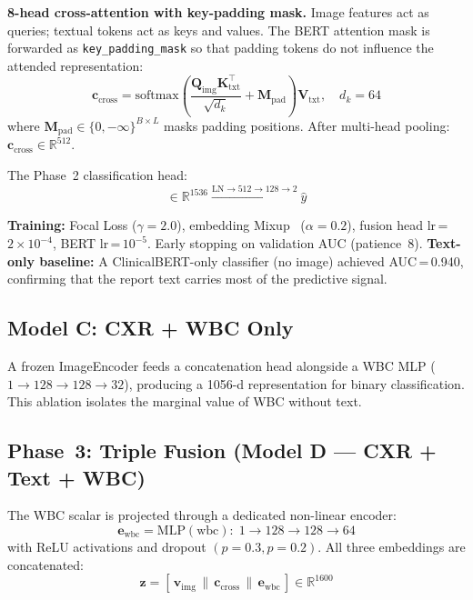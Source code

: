 \documentclass[conference]{IEEEtran}
\begin{document}
\textbf{8-head cross-attention with key-padding mask.} Image features act as queries; textual tokens act as keys and values. The BERT attention mask is forwarded as \texttt{key\_padding\_mask} so that padding tokens do not influence the attended representation:
\begin{equation}
  \mathbf{c}_{\text{cross}} = \text{softmax}\!\left(\frac{\mathbf{Q}_{\text{img}}\mathbf{K}_{\text{txt}}^\top}{\sqrt{d_k}} + \mathbf{M}_{\text{pad}}\right)\mathbf{V}_{\text{txt}}, \quad d_k = 64
  \label{eq:crossattn}
\end{equation}
where $\mathbf{M}_{\text{pad}} \in \{0, -\infty\}^{B\times L}$ masks padding positions. After multi-head pooling: $\mathbf{c}_{\text{cross}} \in \mathbb{R}^{512}$.

The Phase~2 classification head:
\begin{equation}
  [\mathbf{v}_{\text{img}} \,\|\ \mathbf{c}_{\text{cross}}] \in \mathbb{R}^{1536} \xrightarrow{\text{LN} \to 512 \to 128 \to 2} \hat{y}
\end{equation}

\textbf{Training:} Focal Loss ($\gamma\!=\!2.0$), embedding Mixup~\cite{zhang2018mixup} ($\alpha\!=\!0.2$), fusion head lr\,=\,$2\times10^{-4}$, BERT lr\,=\,$10^{-5}$. Early stopping on validation AUC (patience~8). \textbf{Text-only baseline:} A ClinicalBERT-only classifier (no image) achieved AUC\,=\,0.940, confirming that the report text carries most of the predictive signal.

\subsection{Model C: CXR + WBC Only}

A frozen ImageEncoder feeds a concatenation head alongside a WBC MLP ($1\to128\to128\to32$), producing a 1056-d representation for binary classification. This ablation isolates the marginal value of WBC without text.

\subsection{Phase~3: Triple Fusion (Model D — CXR + Text + WBC)}

The WBC scalar is projected through a dedicated non-linear encoder:
\begin{equation}
  \mathbf{e}_{\text{wbc}} = \text{MLP}(\text{wbc}): \; 1 \to 128 \to 128 \to 64
  \label{eq:wbcmlp}
\end{equation}
with ReLU activations and dropout $(p\!=\!0.3, p\!=\!0.2)$. All three embeddings are concatenated:
\begin{equation}
  \mathbf{z} = [\,\mathbf{v}_{\text{img}} \,\|\, \mathbf{c}_{\text{cross}} \,\|\, \mathbf{e}_{\text{wbc}}\,] \in \mathbb{R}^{1600}
  \label{eq:concat}
\end{equation}
\end{document}
